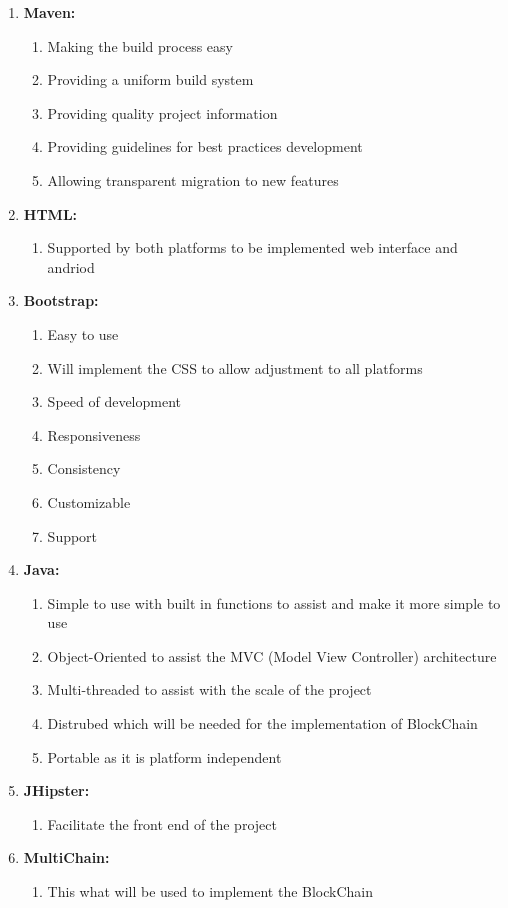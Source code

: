 \begin{enumerate}
		\item \textbf{Maven:}
		\begin{enumerate}
			\item Making the build process easy 
			\item Providing a uniform build system
			\item Providing quality project information
			\item Providing guidelines for best practices development
			\item Allowing transparent migration to new features
		\end{enumerate}
		
		\item \textbf{HTML:}
		\begin{enumerate}
			\item Supported by both platforms to be implemented web interface and andriod
		\end{enumerate}
		
		\item \textbf{Bootstrap:}
		\begin{enumerate}
			\item Easy to use
			\item Will implement the CSS to allow adjustment to all platforms
			\item Speed of development
			\item Responsiveness 
			\item Consistency
			\item Customizable
			\item Support
		\end{enumerate}
		
		\item \textbf{Java:}
		\begin{enumerate}
			\item Simple to use with built in functions to assist and make it more simple to use
			\item Object-Oriented to assist the MVC (Model View Controller) architecture
			\item Multi-threaded to assist with the scale of the project
			\item Distrubed which will be needed for the implementation of BlockChain
			\item Portable as it is platform independent
		\end{enumerate}
		
		\item \textbf{JHipster:}
		\begin{enumerate}
			\item Facilitate the front end of the project
		\end{enumerate}
		
		\item \textbf{MultiChain:}	
		\begin{enumerate}
			\item This what will be used to implement the BlockChain
		\end{enumerate}
	\end{enumerate}